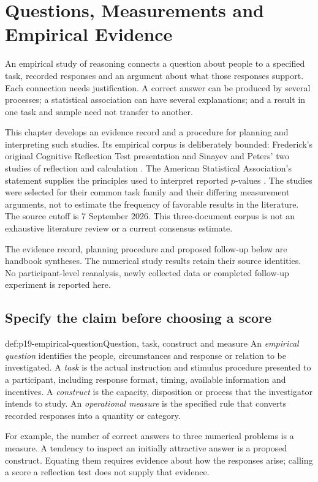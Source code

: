 \chapter{Questions, Measurements and Empirical Evidence}
\label{sec:p19-evidence-methods}

An empirical study of reasoning connects a question about people to a
specified task, recorded responses and an argument about what those responses
support. Each connection needs justification. A correct answer can be produced
by several processes; a statistical association can have several explanations;
and a result in one task and sample need not transfer to another.

This chapter develops an evidence record and a procedure for planning and
interpreting such studies. Its empirical corpus is deliberately bounded:
Frederick's original Cognitive Reflection Test presentation and Sinayev and
Peters' two studies of reflection and calculation
\cite{Frederick2005CRT,SinayevPeters2015Calculation}.
The American Statistical Association's statement supplies the principles used
to interpret reported \(p\)-values \cite[pp.~131--132]{WassersteinLazar2016ASA}.
The studies were selected for their common task family and their differing
measurement arguments, not to estimate the frequency of favorable results in
the literature. The source cutoff is 7 September 2026. This three-document
corpus is not an exhaustive literature review or a current consensus estimate.

The evidence record, planning procedure and proposed follow-up below are
handbook syntheses. The numerical study results retain their source identities.
No participant-level reanalysis, newly collected data or completed follow-up
experiment is reported here.

\section{Specify the claim before choosing a score}
\label{sec:p19-question-and-measure}

\begin{hbdefinition}{def:p19-empirical-question}{Question, task, construct and measure}
An \emph{empirical question} identifies the people, circumstances and response
or relation to be investigated. A \emph{task} is the actual instruction and
stimulus procedure presented to a participant, including response format,
timing, available information and incentives. A \emph{construct} is the
capacity, disposition or process that the investigator intends to study.
An \emph{operational measure} is the specified rule that converts recorded
responses into a quantity or category.

For example, the number of correct answers to three numerical problems is a
measure. A tendency to inspect an initially attractive answer is a proposed
construct. Equating them requires evidence about how the responses arise;
calling a score a reflection test does not supply that evidence.
\end{hbdefinition}

